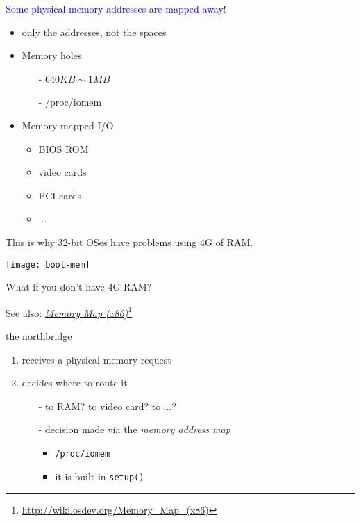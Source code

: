 \begin{frame}%
  \begin{varwidth}{.59\textwidth}
    \textcolor{blue}{Some physical memory addresses are mapped away!}
    \begin{itemize}
    \item only the addresses, not the spaces
    \item Memory holes
      \begin{itemize}
      \item[-] $640KB \sim 1MB$
      \item[-] /proc/iomem
      \end{itemize}
    \item Memory-mapped I/O
      \begin{itemize}
      \item BIOS ROM
      \item video cards
      \item PCI cards
      \item ...
      \end{itemize}
    \end{itemize}
    This is why 32-bit OSes have problems using 4G of RAM.
  \end{varwidth}\hfill
  \begin{varwidth}{.39\textwidth}
    \begin{center}
      \texttt{[image: boot-mem]}
    \end{center}
  \end{varwidth}
  \vspace{1em}
  \begin{center}
    What if you don't have 4G RAM?
  \end{center}
\end{frame}

See also: \href{http://wiki.osdev.org/Memory_Map_(x86)}{\emph{Memory Map (x86)}}\footnote{\url{http://wiki.osdev.org/Memory_Map_(x86)}}

\begin{frame}%
  \begin{block}{the northbridge}
    \begin{enumerate}
    \item receives a physical memory request
    \item decides where to route it
      \begin{itemize}
      \item[-] to RAM? to video card? to ...?
      \item[-] decision made via the \emph{memory address map}
        \begin{itemize}
        \item \texttt{/proc/iomem}
        \item it is built in \texttt{setup()}
        \end{itemize}
      \end{itemize}
    \end{enumerate}
  \end{block}
\end{frame}

